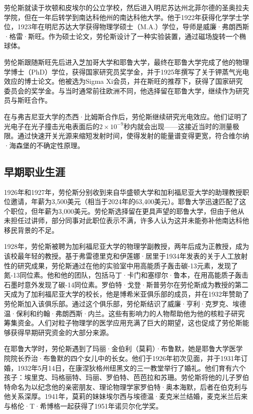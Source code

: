 劳伦斯就读于坎顿和皮埃尔的公立学校，然后进入明尼苏达州北菲尔德的圣奥拉夫学院，但在一年后转学到南达科他州的南达科他大学。他于1922年获得化学学士学位，1923年在明尼苏达大学获得物理学硕士（M.A.）学位，导师是威廉·弗朗西斯·格雷·斯旺。作为硕士论文，劳伦斯设计了一种实验装置，通过磁场旋转一个椭球体。

劳伦斯跟随斯旺先后进入芝加哥大学和耶鲁大学，最终在耶鲁大学完成了他的物理学博士（PhD）学位，获得国家研究员奖学金，并于1925年撰写了关于钾蒸气光电效应的博士论文。他被选为Sigma Xi会员，并在斯旺的推荐下，获得了国家研究委员会的奖学金。与当时通常前往欧洲不同，他选择留在耶鲁大学，继续作为研究员与斯旺合作。

在与弗吉尼亚大学的杰西·比姆斯合作后，劳伦斯继续研究光电效应。他们证明了光电子在光子撞击光电表面后的$2 \times10^{-9}$秒内就会出现——这接近当时的测量极限。通过快速开关光源来缩短发射时间，使得发射的能量谱变得更宽，符合维尔纳·海森堡的不确定性原理。
\subsection{早期职业生涯}
1926年和1927年，劳伦斯分别收到来自华盛顿大学和加利福尼亚大学的助理教授职位邀请，年薪为3,500美元（相当于2024年的63,400美元）。耶鲁大学迅速匹配了这个职位，但年薪为3,000美元。劳伦斯选择留在更具声望的耶鲁大学，但由于他从未担任过讲师，部分同事对此职位表示不满，许多人认为这并未能弥补他南达科他移民背景的不足。

1928年，劳伦斯被聘为加利福尼亚大学的物理学副教授，两年后成为正教授，成为该校最年轻的教授。基于弗雷德里克和伊莲娜·居里于1934年发表的关于人工放射性的研究成果，劳伦斯通过在他的实验室中用高能质子轰击碳-13元素，发现了氮-13同位素。他和他的团队，包括马丁·卡门和塞缪尔·鲁本，在用高能质子轰击石墨时意外发现了碳-14同位素。罗伯特·戈登·斯普劳尔在劳伦斯成为教授的第二天成为了加利福尼亚大学的校长，他是博希米亚俱乐部的成员，并在1932年赞助了劳伦斯加入该俱乐部。通过这个俱乐部，劳伦斯结识了威廉·亨利·克罗克、埃德温·保利和约翰·弗朗西斯·内兰。这些有影响力的人物帮助他为他的核粒子研究筹集资金。人们对粒子物理学的医学应用充满了巨大的期望，这也促成了劳伦斯能够获得早期研究资金的大部分来源。

在耶鲁大学时，劳伦斯遇到了玛丽·金伯利（莫莉）·布鲁默，她是耶鲁大学医学院院长乔治·布鲁默的四个女儿中的长女。他们于1926年初次见面，并于1931年订婚，1932年5月14日，在康涅狄格州纽黑文的三一教堂举行了婚礼。他们育有六个孩子：埃里克、玛格丽特、玛丽、罗伯特、芭芭拉和苏珊。劳伦斯将他的儿子罗伯特命名为以纪念他的亲密朋友、理论物理学家罗伯特·奥本海默，后者在伯克利与他关系深厚。1941年，莫莉的妹妹埃尔西与埃德温·麦克米兰结婚，麦克米兰后来与格伦·T·希博格一起获得了1951年诺贝尔化学奖。
